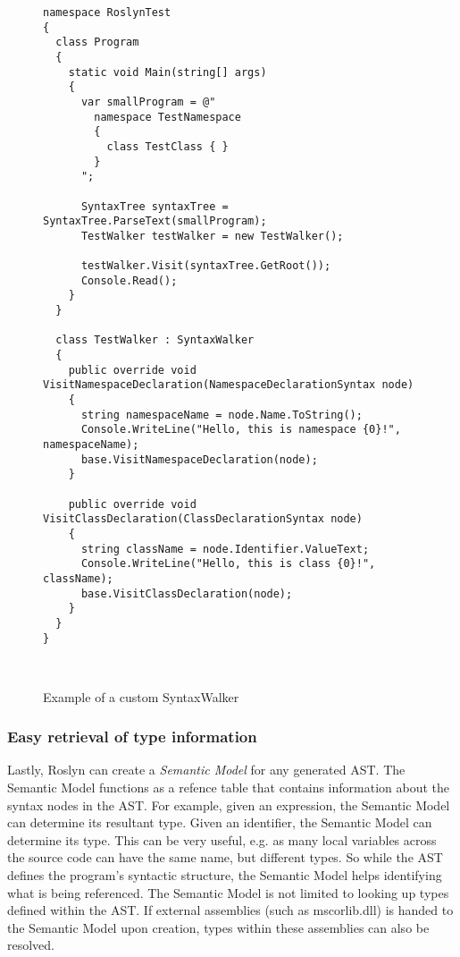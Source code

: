 	\begin{figure}
		\begin{center}
			
		\begin{lstlisting}[language=CSharp,classoffset=1,morekeywords={Program,SyntaxTree,TestWalker,Console,SyntaxWalker,NamespaceDeclarationSyntax,ClassDeclarationSyntax}]
namespace RoslynTest
{
  class Program
  {
    static void Main(string[] args)
    {
      var smallProgram = @"
        namespace TestNamespace 
        {
          class TestClass { }
        }
      ";

      SyntaxTree syntaxTree = SyntaxTree.ParseText(smallProgram);
      TestWalker testWalker = new TestWalker();

      testWalker.Visit(syntaxTree.GetRoot());
      Console.Read();
    }
  }

  class TestWalker : SyntaxWalker
  {
    public override void VisitNamespaceDeclaration(NamespaceDeclarationSyntax node)
    {
      string namespaceName = node.Name.ToString();
      Console.WriteLine("Hello, this is namespace {0}!", namespaceName);
      base.VisitNamespaceDeclaration(node);
    }

    public override void VisitClassDeclaration(ClassDeclarationSyntax node)
    {
      string className = node.Identifier.ValueText;
      Console.WriteLine("Hello, this is class {0}!", className);
      base.VisitClassDeclaration(node);
    }
  }
}



		\end{lstlisting}
		\end{center}
		\caption{Example of a custom SyntaxWalker}
		\label{fig:roslyn_walker_example}
	\end{figure}

  \subsubsection{Easy retrieval of type information} %
  \label{ssub:easy_retrieval_of_type_information}
  	Lastly, Roslyn can create a \emph{Semantic Model} for any generated AST. The Semantic Model functions as a refence table that contains information about the syntax nodes in the AST. For example, given an expression, the Semantic Model can determine its resultant type. Given an identifier, the Semantic Model can determine its type. This can be very useful, e.g. as many local variables across the source code can have the same name, but different types. So while the AST defines the program's syntactic structure, the Semantic Model helps identifying what is being referenced. The Semantic Model is not limited to looking up types defined within the AST. If external assemblies (such as mscorlib.dll) is handed to the Semantic Model upon creation, types within these assemblies can also be resolved.

\FloatBarrier
